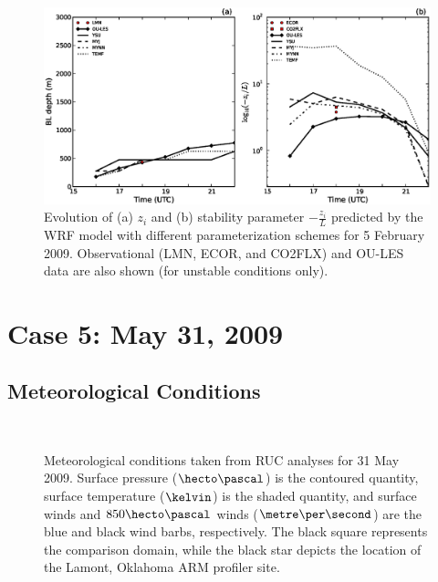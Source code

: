 \begin{figure}[ht!]
\begin{center}
\includegraphics[width=\textwidth]{figures/chapter4/pblh_phi_phys_20090205}
\end{center}
\caption{Evolution of (a) $z_i$ and (b) stability parameter $-\frac{z_i}{L}$ predicted by the WRF model with different parameterization schemes for 5 February 2009. Observational (LMN, ECOR, and CO2FLX) and OU-LES data are also shown (for unstable conditions only).}
\label{figure433}
\end{figure}


\section{Case 5: May 31, 2009}
\label{may31-47}

\subsection{Meteorological Conditions}
\label{mc-471}


\begin{figure}[H]
     \begin{center}
%
        \\ %
%
    \end{center}
    \caption{%
        Meteorological conditions taken from RUC analyses for 31 May 2009. Surface pressure ($\hecto\pascal$) is the contoured quantity, surface temperature ($\kelvin$) is the shaded quantity, and surface winds and $850\hecto\pascal$ winds ($\metre\per\second$) are the blue and black wind barbs, respectively. The black square represents the comparison domain, while the black star depicts the location of the Lamont, Oklahoma ARM profiler site.}%
   \label{figure434}
\end{figure}


